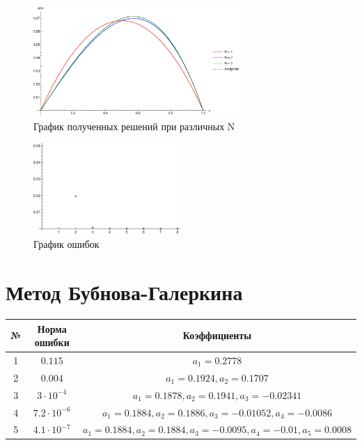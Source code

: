 \documentclass[12pt,a4paper]{article}
\begin{document}
    \begin{figure}[h]
        \centering
        \includegraphics[width=0.7\textwidth]{2.pdf}
        \caption{График полученных решений при различных N}
    \end{figure}
    \begin{figure}[h]
        \centering
        \includegraphics[width=0.5\textwidth]{2_error.pdf}
        \caption{График ошибок}
    \end{figure}

    \pagebreak

    \section{ Метод Бубнова-Галеркина}

    \begin{center}
        \begin{tabular}{|c|c|c|} 
         \hline
         № & Норма ошибки & Коэффициенты \\ 
         \hline
         1 & $0.115$ & $a_1=0.2778$ \\ 
         \hline
         2 & $0.004$ & $a_1=0.1924, a_2=0.1707$ \\ 
         \hline
         3 & $3\cdot10^{-4}$ & $a_1=0.1878, a_2=0.1941, a_3=-0.02341$ \\ 
         \hline
         4 & $7.2\cdot10^{-6}$ & $a_1=0.1884, a_2=0.1886, a_3=-0.01052, a_4=-0.0086$ \\ 
         \hline
         5 & $4.1\cdot10^{-7}$ & $a_1=0.1884, a_2=0.1884, a_3=-0.0095, a_4=-0.01, a_5=0.0008$ \\ 
         \hline
        \end{tabular}
    \end{center}
\end{document}
